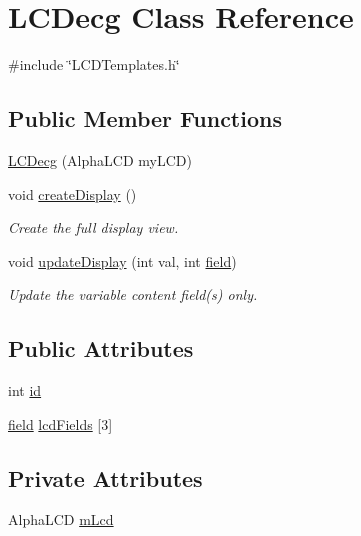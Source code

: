 \hypertarget{class_l_c_decg}{\section{L\-C\-Decg Class Reference}
\label{class_l_c_decg}
}


{\ttfamily \#include \char`\"{}L\-C\-D\-Templates.\-h\char`\"{}}

\subsection*{Public Member Functions}
\begin{DoxyCompactItemize}
\item 
\hyperlink{class_l_c_decg_ac0bd1241a298319f9a34975a65f2f5b2}{L\-C\-Decg} (Alpha\-L\-C\-D my\-L\-C\-D)
\item 
void \hyperlink{class_l_c_decg_a608450942a6793008e974268fd680597}{create\-Display} ()
\begin{DoxyCompactList}\small\item\em Create the full display view. \end{DoxyCompactList}\item 
void \hyperlink{class_l_c_decg_a882ca746da9d222ff5f44e8569ba272d}{update\-Display} (int val, int \hyperlink{_l_c_d_templates_8h_a20a49e010fbfc3a43959f12d92e01bb6}{field})
\begin{DoxyCompactList}\small\item\em Update the variable content field(s) only. \end{DoxyCompactList}\end{DoxyCompactItemize}
\subsection*{Public Attributes}
\begin{DoxyCompactItemize}
\item 
int \hyperlink{class_l_c_decg_a2de8fa6918dc9b61eeb0bd0b2cebe0dc}{id}
\item 
\hyperlink{_l_c_d_templates_8h_a20a49e010fbfc3a43959f12d92e01bb6}{field} \hyperlink{class_l_c_decg_ab782889913185a822ee73c382ccff484}{lcd\-Fields} \mbox{[}3\mbox{]}
\end{DoxyCompactItemize}
\subsection*{Private Attributes}
\begin{DoxyCompactItemize}
\item 
Alpha\-L\-C\-D \hyperlink{class_l_c_decg_aca5f4b83f22c46ed313265f02feebb2a}{m\-Lcd}
\end{DoxyCompactItemize}



